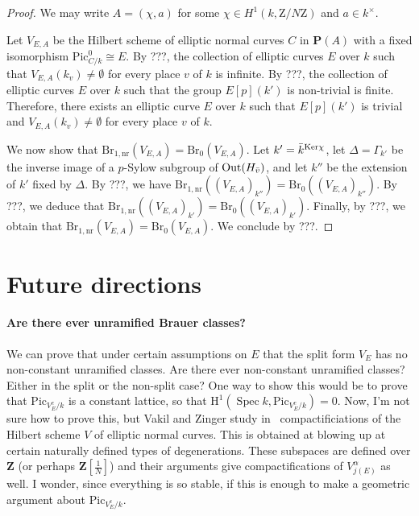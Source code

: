\documentclass[10pt,letterpaper,twoside]{article}
\renewcommand{\H}{\mathrm{H}}
\newcommand{\Z}{\mathrm{Z}}
\renewcommand{\1}{\mathbf{1}}
\newcommand{\bP}{\mathbf{P}}
\newcommand{\bZ}{\mathbf{Z}}
\newcommand{\nr}{\mathrm{nr}}
\newcommand{\Pic}{\mathrm{Pic}}
\newcommand{\Br}{\mathrm{Br}}
\DeclareMathOperator{\Spec}{Spec}
\newcommand{\iso}{\cong}
\theoremstyle{plain}
\theoremstyle{plain}
\theoremstyle{definition}
\theoremstyle{named}
\theoremstyle{definition}
\begin{document}
	\begin{proof}
		We may write $A=(\chi,a)$ for some $\chi\in H^1(k,\Z/N\Z)$ and $a\in k^\times$. 
		
		Let $V_{E,A}$ be the Hilbert scheme of elliptic normal curves $C$ in $\bP(A)$ with a fixed isomorphism $\Pic_{C/k}^0\iso E$. By ???, the collection of elliptic curves $E$ over $k$ such that $V_{E,A}(k_v)\neq \emptyset$ for every place $v$ of $k$ is infinite. By ???, the collection of elliptic curves $E$ over $k$ such that the group $E[p](k')$ is non-trivial is finite. Therefore, there exists an elliptic curve $E$ over $k$ such that $E[p](k')$ is trivial and $V_{E,A}(k_v)\neq \emptyset$ for every place $v$ of $k$.
		
		We now show that $\Br_{1,\nr}(V_{E,A})=\Br_0(V_{E,A})$. Let $k'=\Bar{k}^{\mathrm{Ker}\chi}$, let $\Delta= \Gamma_{k'}$ be the inverse image of a $p$-Sylow subgroup of $\mathrm{Out}(H_{\Bar{v}})$, and let $k''$ be the extension of $k'$ fixed by $\Delta$. By ???, we have $\Br_{1,\nr}((V_{E,A})_{k''})=\Br_0((V_{E,A})_{k''})$. By ???, we deduce that $\Br_{1,\nr}((V_{E,A})_{k'})=\Br_0((V_{E,A})_{k'})$. Finally, by ???, we obtain that $\Br_{1,\nr}(V_{E,A})=\Br_0(V_{E,A})$. We conclude by ???.
	\end{proof}
	
	
	\section{Future directions}
	
	\paragraph{Are there ever unramified Brauer classes?} We can prove that under certain assumptions on
	$E$ that the split form $V_E$ has no non-constant unramified classes. Are there ever non-constant
	unramified classes? Either in the split or the non-split case? One way to show this would be to
	prove that $\Pic_{V^c_E/k}$ is a constant lattice, so that $\H^1(\Spec k,\Pic_{V^c_E/k})=0$. Now,
	I'm not sure how to prove this, but Vakil and Zinger study
	in~\cite{vakil-zinger,vakil-zinger-announce} compactificiations of the Hilbert scheme $V$ of elliptic normal
	curves. This is obtained at blowing up at certain naturally defined types of degenerations. These
	subspaces are defined over $\bZ$ (or perhaps $\bZ[\tfrac{1}{N}]$) and their arguments give
	compactifications of $V_{j(E)}^\alpha$ as well. I wonder, since everything is so stable, if this is
	enough to make a geometric argument about $\Pic_{V^c_E/k}$.
	
\end{document}

